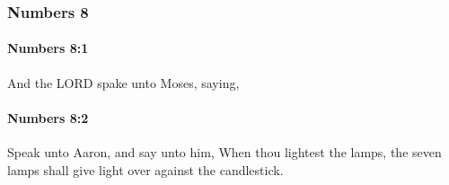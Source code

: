 	\subsubsection{Numbers 8} %
		\label{NUMBERS-8}

		\paragraph{Numbers 8:1} %
			\label{NUMBERS-8-1}

			And the LORD spake unto Moses, saying,


		\paragraph{Numbers 8:2} %
			\label{NUMBERS-8-2}

			Speak unto Aaron, and say unto him, When thou lightest the lamps, the seven lamps shall give light over against the candlestick.

